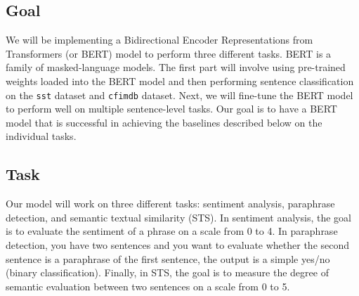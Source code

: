 \documentclass{article}
\begin{document}
\subsection{Goal} 

We will be implementing a Bidirectional Encoder Representations from Transformers (or BERT) model to perform three different tasks. BERT is a family of masked-language models. The first part will involve using pre-trained weights loaded into the BERT model and then performing sentence classification on the \texttt{sst} dataset and \texttt{cfimdb} dataset. Next, we will fine-tune the BERT model to perform well on multiple sentence-level tasks. Our goal is to have a BERT model that is successful in achieving the baselines described below on the individual tasks.

\subsection{Task} 

Our model will work on three different tasks: sentiment analysis, paraphrase detection, and semantic textual similarity (STS). In sentiment analysis, the goal is to evaluate the sentiment of a phrase on a scale from 0 to 4. In paraphrase detection, you have two sentences and you want to evaluate whether the second sentence is a paraphrase of the first sentence, the output is a simple yes/no (binary classification). Finally, in STS, the goal is to measure the degree of semantic evaluation between two sentences on a scale from 0 to 5.
\end{document}
